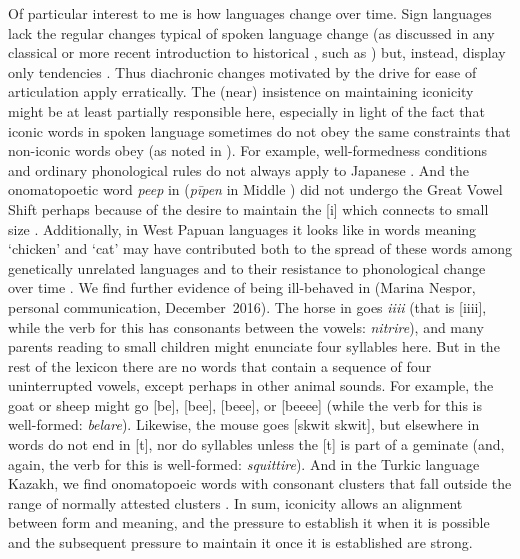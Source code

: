\documentclass[output=paper,
modfonts
]{LSP/langsci}
\begin{document}
Of particular interest to me is how languages change over time.  Sign languages lack the regular changes typical of spoken language change (as discussed in any classical or more recent introduction to historical , such as \citealt{anttila1972}) but, instead, display only tendencies \citep{moser1990}.  Thus diachronic changes motivated by the drive for ease of articulation \citep{napoli2014n,sanders2016a,sanders2016b} apply erratically. The (near) insistence on maintaining iconicity might be at least partially responsible here, especially in light of the fact that iconic words in spoken language sometimes do not obey the same constraints that non-iconic words obey (as noted in \citealt{meir2010}).  For example, well-formedness conditions and ordinary phonological rules do not always apply to Japanese  \citep{ito1995}.  And the onomatopoetic word \emph{peep} in  (\emph{pīpen} in Middle ) did not undergo the Great Vowel Shift perhaps because of the desire to maintain the [i] which connects to small size \citep[294]{hock1986}.  Additionally, in West Papuan languages it looks like  in words meaning ‘chicken’ and ‘cat’ may have contributed both to the spread of these words among genetically unrelated languages and to their resistance to phonological change over time \citep{gasser}. We find further evidence of  being ill-behaved in  (Marina Nespor, personal communication, December~2016).  The horse in  goes \emph{iiii} (that is [iiii], while the verb for this has consonants between the vowels: \emph{nitrire}), and many parents reading to small children might enunciate four syllables here.  But in the rest of the lexicon there are no words that contain a sequence of four uninterrupted vowels, except perhaps in other animal sounds.  For example, the goat or sheep might go [be], [bee], [beee], or [beeee] (while the verb for this is well-formed: \emph{belare}).   Likewise, the mouse goes [skwit skwit], but elsewhere in  words do not end in [t], nor do syllables unless the [t] is part of a geminate (and, again, the verb for this is well-formed: \emph{squittire}).  And in the Turkic language Kazakh, we find onomatopoeic words with consonant clusters that fall outside the range of normally attested clusters \citep{washington}.  In sum, iconicity allows an alignment between form and meaning, and the pressure to establish it when it is possible and the subsequent pressure to maintain it once it is established are strong.  

{\sloppy
\printbibliography[heading=subbibliography,notkeyword=this]
}
\end{document}
